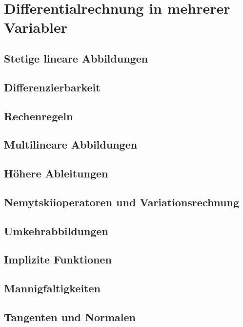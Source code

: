 \chapter{Differentialrechnung in mehrerer Variabler}
\section{Stetige lineare Abbildungen}
\section{Differenzierbarkeit}
\section{Rechenregeln}
\section{Multilineare Abbildungen}
\section{Höhere Ableitungen}
\section{Nemytskiioperatoren und Variationsrechnung}
\section{Umkehrabbildungen}
\section{Implizite Funktionen}
\section{Mannigfaltigkeiten}
\section{Tangenten und Normalen}
